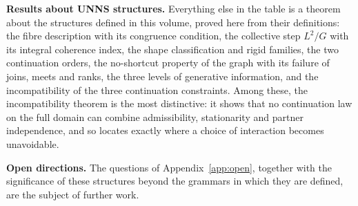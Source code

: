 \documentclass[11pt,oneside,openany]{book}
\theoremstyle{definition}
\theoremstyle{remark}
\begin{document}
\textbf{Results about UNNS structures.} Everything else in the table is a theorem about the structures defined in this volume, proved here from their definitions: the fibre description with its congruence condition, the collective step \(L^2/G\) with its integral coherence index, the shape classification and rigid families, the two continuation orders, the no-shortcut property of the graph with its failure of joins, meets and ranks, the three levels of generative information, and the incompatibility of the three continuation constraints. Among these, the incompatibility theorem is the most distinctive: it shows that no continuation law on the full domain can combine admissibility, stationarity and partner independence, and so locates exactly where a choice of interaction becomes unavoidable.

\textbf{Open directions.} The questions of Appendix~\ref{app:open}, together with the significance of these structures beyond the grammars in which they are defined, are the subject of further work.
\normalsize
\end{document}
